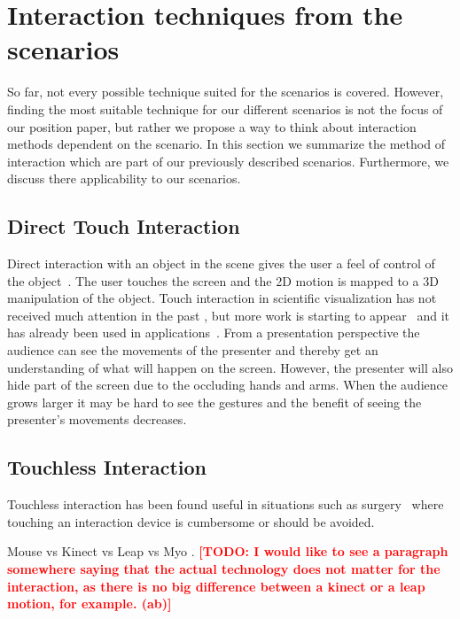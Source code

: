 \documentclass[review,journal]{vgtc}         %
\newcommand{\todo}[1]{\textbf{\textcolor{red}{[TODO: {#1}]}}}
\begin{document}
\section{Interaction techniques from the scenarios}

So far, not every possible technique suited for the scenarios is covered. However, finding the most suitable technique for our different scenarios is not the focus of our position paper, but rather we propose a way to think about interaction methods dependent on the scenario. In this section we summarize the method of interaction which are part of our previously described scenarios. Furthermore, we discuss there applicability to our scenarios.

\subsection{Direct Touch Interaction}
Direct interaction with an object in the scene gives the user a feel of control of the object~\cite{isenberg2009studying}. 
The user touches the screen and the 2D motion is mapped to a 3D manipulation of the object. 
Touch interaction in scientific visualization has not received much attention in the past \cite{isenberg:hal-00781512}, 
but more work is starting to appear~\cite{Klein:2012:DSD:2322389.2322403} and it has already been used in applications~\cite{LRFPY11}.
From a presentation perspective the audience can see the movements of the presenter and thereby get an understanding of what will happen on the screen.
However, the presenter will also hide part of the screen due to the occluding hands and arms. 
When the audience grows larger it may be hard to see the gestures and the benefit of seeing the presenter's movements decreases.


\subsection{Touchless Interaction}
Touchless interaction has been found useful in situations such as surgery~\cite{Mentis:2012:IPI:2207676.2208536} where touching an interaction device is cumbersome or should be avoided.

Mouse vs Kinect vs Leap vs Myo \cite{doi:10.1117/12.2006994}. \todo{I would like to see a paragraph somewhere saying that the actual technology does not matter for the interaction, as there is no big difference between a kinect or a leap motion, for example. (ab)}
\end{document}
